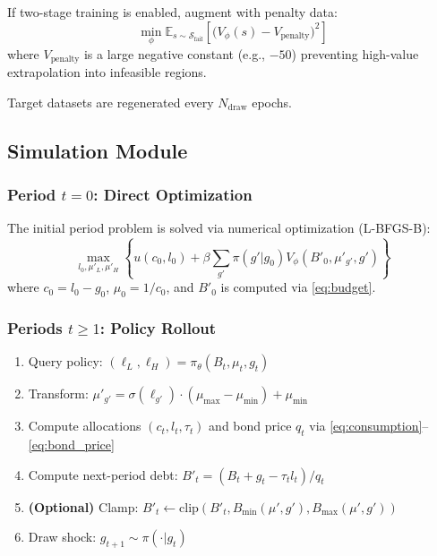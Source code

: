 If two-stage training is enabled, augment with penalty data:
\begin{equation}
    \min_\phi \mathbb{E}_{s \sim \mathcal{S}_{\text{fail}}} \left[ \bigl(V_\phi(s) - V_{\text{penalty}}\bigr)^2 \right]
\end{equation}
where $V_{\text{penalty}}$ is a large negative constant (e.g., $-50$) preventing high-value extrapolation into infeasible regions.

Target datasets are regenerated every $N_{\text{draw}}$ epochs.


\subsection{Simulation Module}

\subsubsection{Period $t = 0$: Direct Optimization}
The initial period problem is solved via numerical optimization (L-BFGS-B):
\begin{equation}
    \max_{l_0, \mu'_L, \mu'_H} \left\{ u(c_0, l_0) + \beta \sum_{g'} \pi(g'|g_0) V_\phi(B'_0, \mu'_{g'}, g') \right\}
\end{equation}
where $c_0 = l_0 - g_0$, $\mu_0 = 1/c_0$, and $B'_0$ is computed via \eqref{eq:budget}.

\subsubsection{Periods $t \geq 1$: Policy Rollout}
\begin{enumerate}
    \item Query policy: $(\ell_L, \ell_H) = \pi_\theta(B_t, \mu_t, g_t)$
    \item Transform: $\mu'_{g'} = \sigma(\ell_{g'}) \cdot (\mu_{\max} - \mu_{\min}) + \mu_{\min}$
    \item Compute allocations $(c_t, l_t, \tau_t)$ and bond price $q_t$ via \eqref{eq:consumption}--\eqref{eq:bond_price}
    \item Compute next-period debt: $B'_t = (B_t + g_t - \tau_t l_t) / q_t$
    \item \textbf{(Optional)} Clamp: $B'_t \leftarrow \text{clip}(B'_t, B_{\min}(\mu', g'), B_{\max}(\mu', g'))$
    \item Draw shock: $g_{t+1} \sim \pi(\cdot | g_t)$
\end{enumerate}

